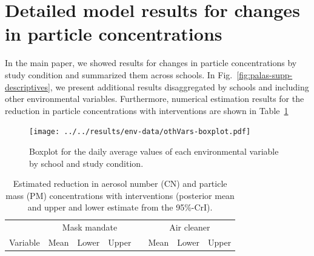 \documentclass[fleqn,11pt]{wlscirep_supp}
\begin{document}
\clearpage

\section{Detailed model results for changes in particle concentrations}\label{sec:detailed-palas}

In the main paper, we showed results for changes in particle concentrations by study condition and summarized them across schools. In Fig.~\ref{fig:palas-supp-descriptives}, we present additional results disaggregated by schools and including other environmental variables. Furthermore, numerical estimation results for the reduction in particle concentrations with interventions are shown in Table~\ref{tab:palas-est-results}

\begin{figure}[!htb]
\centering
    \texttt{[image: ../../results/env-data/othVars-boxplot.pdf]}
    \caption[Boxplot of environmental variables by school and study condition]{Boxplot for the daily average values of each environmental variable by school and study condition.}
    \label{fig:env-descriptives-other-vars}
\end{figure}

\begin{table}[!htpb]
    \caption[Estimated reduction in aerosol and particle concentrations with interventions]{Estimated reduction in aerosol number (CN) and particle mass (PM) concentrations with interventions (posterior mean and upper and lower estimate from the 95\%-CrI).}
    \label{tab:palas-est-results}
    \centering
    \footnotesize
    \begin{tabular}{l r r r c r r r }
    \toprule
    & \multicolumn{3}{c}{Mask mandate} & & \multicolumn{3}{c}{Air cleaner} \\ \cline{2-4} \cline{6-8}
    Variable & Mean & Lower & Upper & & Mean & Lower & Upper \\
    \midrule
    
    \bottomrule
    \end{tabular}
    
\end{table}

\clearpage


\end{document}
